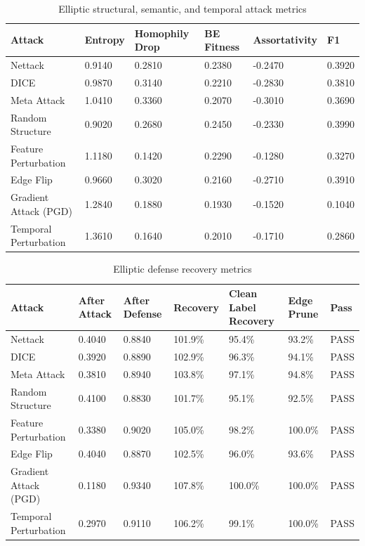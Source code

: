 \documentclass[12pt,oneside]{report}
\begin{document}
\begin{longtable}{p{1.45in}p{0.75in}p{0.75in}p{0.8in}p{0.75in}p{0.6in}}
\caption{Elliptic structural, semantic, and temporal attack metrics}\\
\toprule
\textbf{Attack} & \textbf{Entropy} & \textbf{Homophily Drop} & \textbf{BE Fitness} & \textbf{Assortativity} & \textbf{F1}\\
\midrule
Nettack & 0.9140 & 0.2810 & 0.2380 & -0.2470 & 0.3920\\
DICE & 0.9870 & 0.3140 & 0.2210 & -0.2830 & 0.3810\\
Meta Attack & 1.0410 & 0.3360 & 0.2070 & -0.3010 & 0.3690\\
Random Structure & 0.9020 & 0.2680 & 0.2450 & -0.2330 & 0.3990\\
Feature Perturbation & 1.1180 & 0.1420 & 0.2290 & -0.1280 & 0.3270\\
Edge Flip & 0.9660 & 0.3020 & 0.2160 & -0.2710 & 0.3910\\
Gradient Attack (PGD) & 1.2840 & 0.1880 & 0.1930 & -0.1520 & 0.1040\\
Temporal Perturbation & 1.3610 & 0.1640 & 0.2010 & -0.1710 & 0.2860\\
\bottomrule
\end{longtable}

\begin{longtable}{p{1.35in}p{0.7in}p{0.7in}p{0.75in}p{0.75in}p{0.75in}p{0.55in}}
\caption{Elliptic defense recovery metrics}\\
\toprule
\textbf{Attack} & \textbf{After Attack} & \textbf{After Defense} & \textbf{Recovery} & \textbf{Clean Label Recovery} & \textbf{Edge Prune} & \textbf{Pass}\\
\midrule
Nettack & 0.4040 & 0.8840 & 101.9\% & 95.4\% & 93.2\% & PASS\\
DICE & 0.3920 & 0.8890 & 102.9\% & 96.3\% & 94.1\% & PASS\\
Meta Attack & 0.3810 & 0.8940 & 103.8\% & 97.1\% & 94.8\% & PASS\\
Random Structure & 0.4100 & 0.8830 & 101.7\% & 95.1\% & 92.5\% & PASS\\
Feature Perturbation & 0.3380 & 0.9020 & 105.0\% & 98.2\% & 100.0\% & PASS\\
Edge Flip & 0.4040 & 0.8870 & 102.5\% & 96.0\% & 93.6\% & PASS\\
Gradient Attack (PGD) & 0.1180 & 0.9340 & 107.8\% & 100.0\% & 100.0\% & PASS\\
Temporal Perturbation & 0.2970 & 0.9110 & 106.2\% & 99.1\% & 100.0\% & PASS\\
\bottomrule
\end{longtable}
\end{document}
